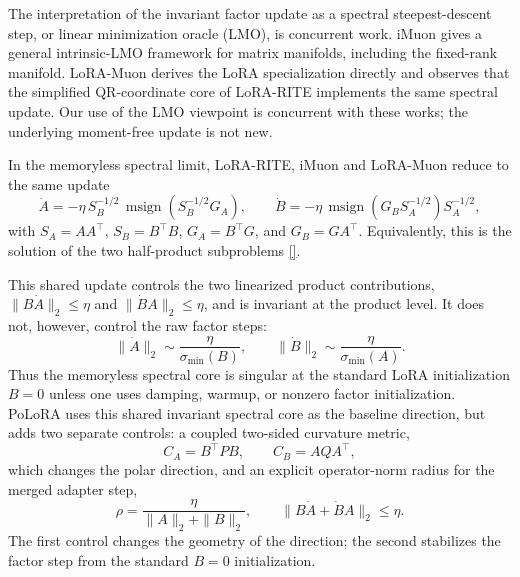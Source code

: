 \documentclass[11pt]{article}
\DeclareMathOperator{\polar}{msign}          %
\newcommand{\methodname}{PoLoRA\xspace}
\theoremstyle{plain}
\theoremstyle{definition}
\theoremstyle{remark}
\begin{document}
The interpretation of the invariant factor update as a spectral
steepest-descent step, or linear minimization oracle (LMO), is
concurrent work.  iMuon \cite{imuon} gives a general intrinsic-LMO
framework for matrix manifolds, including the fixed-rank manifold.
LoRA-Muon \cite{loramuon} derives the LoRA specialization directly and
observes that the simplified QR-coordinate core of LoRA-RITE implements
the same spectral update.  Our use of the LMO viewpoint is concurrent
with these works; the underlying moment-free update is not new.

In the memoryless spectral limit, LoRA-RITE, iMuon and LoRA-Muon reduce to the same update
\[
  \dot A
  =
  -\eta\,S_B^{-1/2}\,
  \polar\!\left(S_B^{-1/2}G_A\right),
  \qquad
  \dot B
  =
  -\eta\,
  \polar\!\left(G_BS_A^{-1/2}\right)S_A^{-1/2},
\]
with $S_A=AA^\top$, $S_B=B^\top B$, $G_A=B^\top G$, and
$G_B=GA^\top$.  Equivalently, this is the solution of the two half-product subproblems
\eqref{}.




This shared update controls the two linearized product contributions,
$\|B\dot A\|_2\le \eta$ and $\|\dot B A\|_2\le \eta$,
and is invariant at the product level.  It does not, however, control
the raw factor steps:
\[
    \|\dot A\|_2
    \sim
    \frac{\eta}{\sigma_{\min}(B)},
    \qquad
    \|\dot B\|_2
    \sim
    \frac{\eta}{\sigma_{\min}(A)} .
\]
Thus the memoryless spectral core is singular at the standard LoRA
initialization $B=0$ unless one uses damping, warmup, or nonzero factor
initialization.  \methodname{} uses this shared invariant spectral core
as the baseline direction, but adds two separate controls: a coupled
two-sided curvature metric,
\[
    C_A=B^\top P B,\qquad C_B=AQA^\top ,
\]
which changes the polar direction, and an explicit operator-norm radius
for the merged adapter step,
\begin{equation} \label{e-rho-eta-adapter-stepsize}
    \rho=\frac{\eta}{\|A\|_2+\|B\|_2},
    \qquad
    \|B\dot A+\dot B A\|_2\le \eta .
\end{equation}
The first control changes the geometry of the direction; the second
stabilizes the factor step from the standard $B=0$ initialization.
\end{document}
